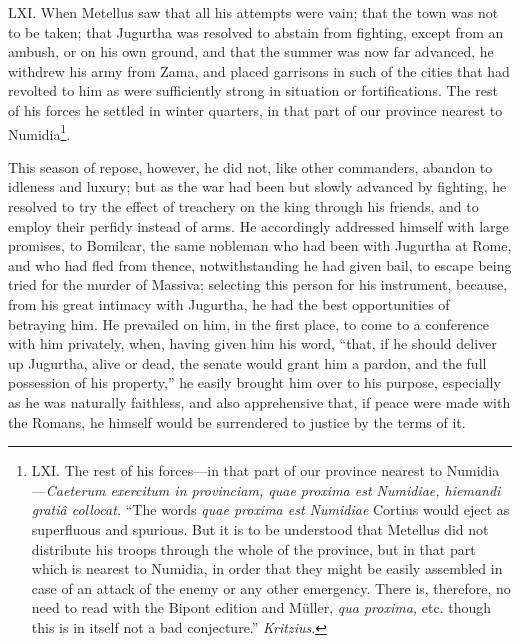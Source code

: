 LXI. When Metellus saw that all his attempts were vain; that the town
was not to be taken; that Jugurtha was resolved to abstain from
fighting, except from an ambush, or on his own ground, and that the
summer was now far advanced, he withdrew his army from Zama, and
placed garrisons in such of the cities that had revolted to him as
were sufficiently strong in situation or fortifications. The rest of
his forces he settled in winter quarters, in that part of our province
nearest to Numidia\footnote{LXI. The rest of his forces—in that part of our province
nearest to Numidia—\emph{Caeterum exercitum in provinciam, quae proxima
est Numidiae, hiemandi gratiâ collocat.} ``The words \emph{quae proxima est
Numidiae} Cortius would eject as superfluous and spurious. But it is
to be understood that Metellus did not distribute his troops through
the whole of the province, but in that part which is nearest to
Numidia, in order that they might be easily assembled in case of an
attack of the enemy or any other emergency. There is, therefore, no
need to read with the Bipont edition and Müller, \emph{qua proxima,} etc.
though this is in itself not a bad conjecture.'' \emph{Kritzius}.}.

This season of repose, however, he did not, like other commanders,
abandon to idleness and luxury; but as the war had been but slowly
advanced by fighting, he resolved to try the effect of treachery on
the king through his friends, and to employ their perfidy instead of
arms. He accordingly addressed himself with large promises, to
Bomilcar, the same nobleman who had been with Jugurtha at Rome, and
who had fled from thence, notwithstanding he had given bail, to escape
being tried for the murder of Massiva; selecting this person for his
instrument, because, from his great intimacy with Jugurtha, he had the
best opportunities of betraying him. He prevailed on him, in the first
place, to come to a conference with him privately, when, having given
him his word, ``that, if he should deliver up Jugurtha, alive or dead,
the senate would grant him a pardon, and the full possession of his
property,'' he easily brought him over to his purpose, especially as he
was naturally faithless, and also apprehensive that, if peace were
made with the Romans, he himself would be surrendered to justice by
the terms of it.

